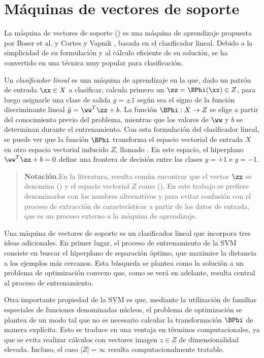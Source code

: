 \section{Máquinas de vectores de soporte}
La máquina de vectores de soporte ()
es una máquina de aprendizaje propuesta por Boser et al. \cite{boser}
y Cortes y Vapnik \cite{svm}, basada en el clasificador lineal.
Debido a la simplicidad de su formulación y al cálculo eficiente de su
solución, se ha convertido en una técnica muy popular para
clasificación.

Un \emph{clasificador lineal} \cite{nilsson} es una máquina de
aprendizaje en la que, dado un patrón de entrada $\xx\in{}X$ a
clasificar, calcula primero un  $\zz=\BPhi(\xx)\in{}Z$,
para luego asignarle una clase de salida $y=\pm{}1$ según sea el signo
de la función discriminante lineal $\hat{y}=\ww^T\zz+b$. La función
$\BPhi:X\rightarrow{}Z$ se elige a partir del conocimiento previo del
problema, mientras que los valores de $\ww$ y $b$ se determinan
durante el entrenamiento.  Con esta formulación del clasificador
lineal, se puede ver que la función $\BPhi$ transforma el espacio
vectorial de entrada $X$ en otro espacio vectorial inducido $Z$,
llamado . En este espacio, el hiperplano $\ww^T\zz+b=0$
define una frontera de decisión entre las clases $y=+1$ e $y=-1$.

\begin{quote}
  {\bfseries Notación.}\quad{}En la literatura, resulta común encontrar que
  el vector $\zz$ se denomina 
  () y el espacio vectorial $Z$ como  ().  En este trabajo se
  prefiere denominarlos con los nombres alternativos 
  y  para evitar confusión con el proceso
  de extracción de características a partir de los datos de entrada,
  que es un proceso externo a la máquina de aprendizaje.
\end{quote}

Una máquina de vectores de soporte es un clasificador lineal que
incorpora tres ideas adicionales. En primer lugar, el proceso de
entrenamiento de la SVM consiste en buscar el hiperplano de separación
óptimo, que maximice la distancia a los ejemplos más cercanos. Esta
búsqueda se plantea como la solución a un problema de optimización
convexo que, como se verá en adelante, resulta central al proceso
de entrenamiento.

Otra importante propiedad de la SVM es que, mediante la utilización de
familias especiales de funciones denominadas núcleos, el problema de
optimización se plantea de un modo tal que no es necesario calcular la
transformación $\BPhi$ de manera explícita. Esto se traduce en una
ventaja en términos computacionales, ya que se evita realizar cálculos
con vectores imagen $z\in{}Z$ de dimensionalidad elevada.
Incluso, el caso $|Z|=\infty$ resulta computacionalmente tratable.

